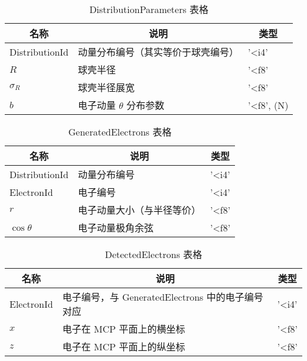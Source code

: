 \documentclass{article}
\begin{document}
\begin{table}[H]
    \caption{DistributionParameters 表格}
        \label{tab:DistributionParameters}
        \centering
        {
            \begin{tabular}[c]{l|l|l}
                \hline
                \multicolumn{1}{c|}{\textbf{名称}} & 
                \multicolumn{1}{c|}{\textbf{说明}} & 
                \multicolumn{1}{c}{\textbf{类型}} \\
                \hline
                DistributionId & 动量分布编号（其实等价于球壳编号） & '<i4' \\
                $R$ & 球壳半径 & '<f8' \\
                $\sigma_R$ & 球壳半径展宽 & '<f8' \\
                $b$ & 电子动量 $\theta$ 分布参数 & '<f8', (N)\\
                \hline
            \end{tabular}
        }
\end{table}

\begin{table}[H]
    \caption{GeneratedElectrons 表格}
        \label{tab:GeneratedElectrons2}
        \centering
        {
            \begin{tabular}[c]{l|l|l}
                \hline
                \multicolumn{1}{c|}{\textbf{名称}} & 
                \multicolumn{1}{c|}{\textbf{说明}} & 
                \multicolumn{1}{c}{\textbf{类型}} \\
                \hline
                DistributionId & 动量分布编号 & '<i4' \\
                ElectronId & 电子编号 & '<i4' \\
                $r$ & 电子动量大小（与半径等价） & '<f8' \\
                $\cos\theta$ & 电子动量极角余弦 & '<f8' \\
                \hline
            \end{tabular}
        }
\end{table}

\begin{table}[H]
    \caption{DetectedElectrons 表格}
        \label{tab:DetectedElectrons2}
        \centering
        {
            \begin{tabular}[c]{l|l|l}
                \hline
                \multicolumn{1}{c|}{\textbf{名称}} & 
                \multicolumn{1}{c|}{\textbf{说明}} & 
                \multicolumn{1}{c}{\textbf{类型}} \\
                \hline
                ElectronId & 电子编号，与 GeneratedElectrons 中的电子编号对应 & '<i4' \\
                $x$ & 电子在 MCP 平面上的横坐标 & '<f8' \\
                $z$ & 电子在 MCP 平面上的纵坐标 & '<f8' \\
                \hline
            \end{tabular}
        }
\end{table}
\end{document}
